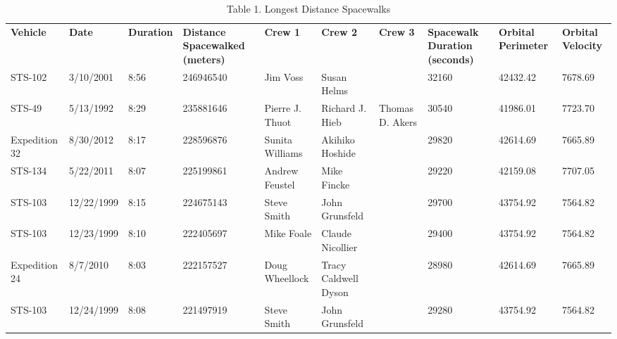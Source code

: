 \documentclass[sigconf]{acmart}
\begin{document}
\begin{table}[]
	\centering
	\caption{Table 1. Longest Distance Spacewalks}
	\label{mytable}
	\begin{tabular}{llllllllll}
		\textbf{Vehicle} & \textbf{Date} & \textbf{Duration} & \textbf{Distance Spacewalked (meters)} & \textbf{Crew 1}    & \textbf{Crew 2}      & \textbf{Crew 3} & \textbf{Spacewalk Duration (seconds)} & \textbf{Orbital Perimeter} & \textbf{Orbital Velocity} \\
		STS-102          & 3/10/2001     & 8:56              & 246946540                              & Jim Voss           & Susan Helms          &                 & 32160                                 & 42432.42                   & 7678.69                   \\
		STS-49           & 5/13/1992     & 8:29              & 235881646                              & Pierre J. Thuot    & Richard J. Hieb      & Thomas D. Akers & 30540                                 & 41986.01                   & 7723.70                   \\
		Expedition 32    & 8/30/2012     & 8:17              & 228596876                              & Sunita Williams    & Akihiko Hoshide      &                 & 29820                                 & 42614.69                   & 7665.89                   \\
		STS-134          & 5/22/2011     & 8:07              & 225199861                              & Andrew Feustel     & Mike Fincke          &                 & 29220                                 & 42159.08                   & 7707.05                   \\
		STS-103          & 12/22/1999    & 8:15              & 224675143                              & Steve Smith        & John Grunsfeld       &                 & 29700                                 & 43754.92                   & 7564.82                   \\
		STS-103          & 12/23/1999    & 8:10              & 222405697                              & Mike Foale         & Claude Nicollier     &                 & 29400                                 & 43754.92                   & 7564.82                   \\
		Expedition 24    & 8/7/2010      & 8:03              & 222157527                              & Doug Wheellock     & Tracy Caldwell Dyson &                 & 28980                                 & 42614.69                   & 7665.89                   \\
		STS-103          & 12/24/1999    & 8:08              & 221497919                              & Steve Smith        & John Grunsfeld       &                 & 29280                                 & 43754.92                   & 7564.82                   \\

\end{tabular}
\end{table}
\end{document}
